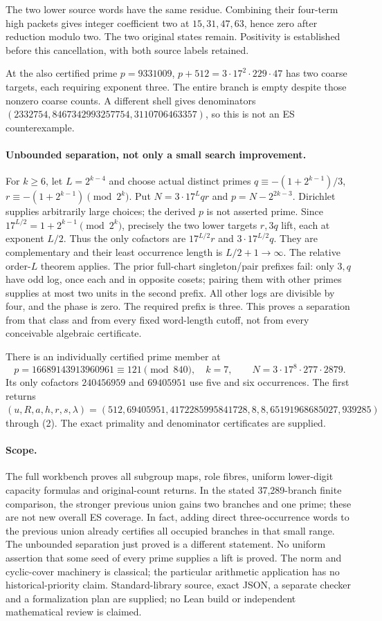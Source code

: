 \documentclass[10pt,a4paper]{article}
\begin{document}
The two lower source words have the same residue. Combining their four-term
high packets gives integer coefficient two at $15,31,47,63$, hence zero after
reduction modulo two. The two original states remain. Positivity is established
before this cancellation, with both source labels retained.

At the also certified prime $p=9331009$,
$p+512=3\cdot17^2\cdot229\cdot47$ has two coarse targets, each requiring
exponent three. The entire branch is empty despite those nonzero coarse counts.
A different shell gives denominators
$(2332754,8467342993257754,3110706463357)$, so this is not an ES counterexample.

\paragraph{Unbounded separation, not only a small search improvement.}
For $k\ge6$, let $L=2^{k-4}$ and choose actual distinct primes
$q\equiv-(1+2^{k-1})/3$, $r\equiv-(1+2^{k-1})\pmod{2^k}$.
Put $N=3\cdot17^Lqr$ and $p=N-2^{2k-3}$. Dirichlet supplies arbitrarily large
choices; the derived $p$ is not asserted prime. Since
$17^{L/2}=1+2^{k-1}\pmod{2^k}$, precisely the two lower targets $r,3q$ lift,
each at exponent $L/2$. Thus the only cofactors are
$17^{L/2}r$ and $3\cdot17^{L/2}q$. They are complementary and their least
occurrence length is $L/2+1\to\infty$. The relative order-$L$ theorem applies.
The prior full-chart singleton/pair prefixes fail: only $3,q$ have odd log,
once each and in opposite cosets; pairing them with other primes supplies at
most two units in the second prefix. All other logs are divisible by four,
and the phase is zero. The required prefix is three. This proves a separation
from that class and from every fixed word-length cutoff, not from every
conceivable algebraic certificate.

There is an individually certified prime member at
\[
 p=16689143913960961\equiv121\pmod{840},\quad k=7,\qquad
 N=3\cdot17^8\cdot277\cdot2879.
\]
Its only cofactors $240456959$ and $69405951$ use five and six occurrences.
The first returns
$(u,R,a,h,r,s,\lambda)=(512,69405951,4172285995841728,8,8,65191968685027,939285)$
through (2). The exact primality and denominator certificates are supplied.

\paragraph{Scope.}
The full workbench proves all subgroup maps, role fibres, uniform lower-digit
capacity formulas and original-count returns. In the stated 37,289-branch
finite comparison, the stronger previous union gains two branches and one prime;
these are not new overall ES coverage. In fact, adding direct three-occurrence
words to the previous union already certifies all occupied branches in that
small range. The unbounded separation just proved is a different statement. No uniform assertion that some seed of
every prime supplies a lift is proved. The norm and cyclic-cover machinery is
classical; the particular arithmetic application has no historical-priority
claim. Standard-library source, exact JSON, a separate checker and a formalization
plan are supplied; no Lean build or independent mathematical review is claimed.
\end{document}
